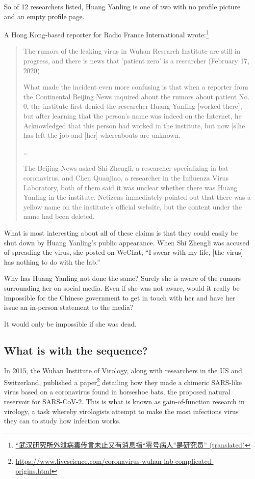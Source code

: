 \documentclass[11pt]{article}
\begin{document}
So of 12 researchers listed, Huang Yanling is one of two with no profile picture and an empty profile page.

A Hong Kong-based reporter for Radio France International wrote:\footnote{\href{https://archive.is/PF9Fk}{``武汉研究所外泄病毒传言未止又有消息指“零号病人”是研究员'' (translated)}}
\begin{quote}
The rumors of the leaking virus in Wuhan Research Institute are still in progress, and there is news that ’patient zero’ is a researcher (February 17, 2020)

What made the incident even more confusing is that when a reporter from the Continental Beijing News inquired about the rumors about patient No. 0, the institute first denied the researcher Huang Yanling [worked there], but after learning that the person’s name was indeed on the Internet, he Acknowledged that this person had worked in the institute, but now [s]he has left the job and [her] whereabouts are unknown.

\ldots{}

The Beijing News asked Shi Zhengli, a researcher specializing in bat coronavirus, and Chen Quanjiao, a researcher in the Influenza Virus Laboratory, both of them said it was unclear whether there was Huang Yanling in the institute. Netizens immediately pointed out that there was a yellow name on the institute’s official website, but the content under the name had been deleted.
\end{quote}

What is most interesting about all of these claims is that they could easily be shut down by Huang Yanling’s public appearance. When Shi Zhengli was accused of spreading the virus, she posted on WeChat, ``I swear with my life, [the virus] has nothing to do with the lab.''

Why has Huang Yanling not done the same? Surely she is aware of the rumors surrounding her on social media. Even if she was not aware, would it really be impossible for the Chinese government to get in touch with her and have her issue an in-person statement to the media?

It would only be impossible if she was dead.

\subsection{What is with the sequence?}
\label{sec:orgd2732e3}
In 2015, the Wuhan Institute of Virology, along with researchers in the US and Switzerland, published a paper\footnote{\url{https://www.livescience.com/coronavirus-wuhan-lab-complicated-origins.html}} detailing how they made a chimeric SARS-like virus based on a coronavirus found in horseshoe bats, the proposed natural reservoir for SARS-CoV-2. This is what is known as gain-of-function research in virology, a task whereby virologists attempt to make the most infections virus they can to study how infection works.
\end{document}
